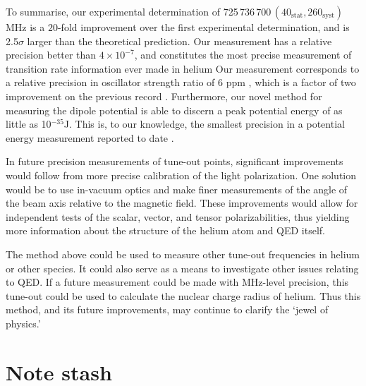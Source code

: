 	To summarise, our experimental determination of 725\,736\,700\,$(40_{\mathrm{stat}},260_{\mathrm{syst}})$ MHz is a \(20\)-fold improvement over the first experimental determination, and is 2.5$\sigma$ larger than the theoretical prediction. 
	Our measurement has a relative precision better than $4\times 10^{-7}$, and constitutes the most precise measurement of transition rate information ever made in helium \cite{Mitroy13}
	Our measurement corresponds to a relative precision in oscillator strength ratio of 6 ppm \cite{ArxivTO}, which is a factor of two improvement on the previous record \cite{Mitroy13}. 
	Furthermore, our novel method for measuring the dipole potential is able to discern a peak potential energy of as little as 10$^{-35}$J. This is, to our knowledge, the smallest precision in a potential energy measurement reported to date \cite{ArxivTO}.
	 
	In future precision measurements of tune-out points, significant improvements would follow from more precise calibration of the light polarization.
	One solution would be to use in-vacuum optics and make finer measurements of the angle of the beam axis relative to the magnetic field.
	These improvements would allow for independent tests of the scalar, vector, and tensor polarizabilities, thus yielding more information about the structure of the helium atom and QED itself.

	The method above could be used to measure other tune-out frequencies in helium or other species.
	It could also serve as a means to investigate other issues relating to QED. 
	If a future measurement could be made with MHz-level precision,  this tune-out could be used to calculate the nuclear charge radius of helium. 
	Thus this method, and its future improvements, may continue to  clarify the `jewel of physics.'

\section{Note stash}

